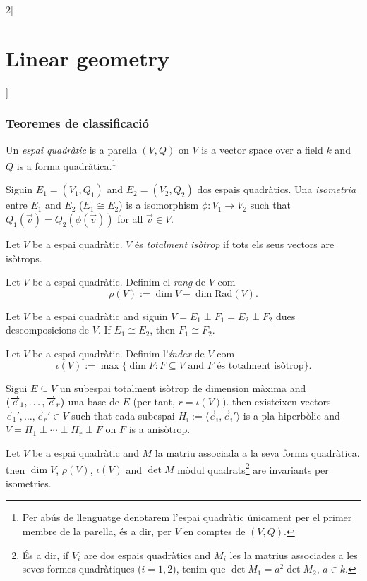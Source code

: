 \documentclass[class=article,10pt,crop=false]{standalone}
\begin{document}
\begin{multicols}{2}[\section{Linear geometry}]
\subsubsection{Teoremes de classificació}
\begin{definition}
Un \textit{espai quadràtic} is a parella $(V,Q)$ on $V$ is a vector space over a field $k$ and $Q$ is a forma quadràtica.\footnote{Per abús de llenguatge denotarem l'espai quadràtic únicament per el primer membre de la parella, és a dir, per $V$ en comptes de $(V,Q)$.}
\end{definition}
\begin{definition}
Siguin $E_1=(V_1,Q_1)$ and $E_2=(V_2,Q_2)$ dos espais quadràtics. Una \textit{isometria} entre $E_1$ and $E_2$ ($E_1\cong E_2$) is a isomorphism $\phi:V_1\rightarrow V_2$ such that $Q_1(\overrightarrow{v})=Q_2(\phi(\overrightarrow{v}))$ for all $\overrightarrow{v}\in V$.
\end{definition}
\begin{definition}
Let $V$ be a espai quadràtic. $V$ és \textit{totalment isòtrop} if tots els seus vectors are isòtrops.
\end{definition}
\begin{definition}
Let $V$ be a espai quadràtic. Definim el \textit{rang} de $V$ com $$\rho(V):=\dim V-\dim\text{Rad}(V).$$
\end{definition}
\begin{theorem}
Let $V$ be a espai quadràtic and siguin $V=E_1\perp F_1=E_2\perp F_2$ dues descomposicions de $V$. If $E_1\cong E_2$, then $F_1\cong F_2$.
\end{theorem}
\begin{definition}
Let $V$ be a espai quadràtic. Definim l'\textit{índex} de $V$ com
$$\iota(V):=\max\{\dim F:F\subseteq V\text{ and $F$ és totalment isòtrop}\}.$$
\end{definition}
\begin{theorem}
Sigui $E\subseteq V$ un subespai totalment isòtrop de dimension màxima and $(\overrightarrow{e}_1,\ldots,\\\overrightarrow{e}_r)$ una base de $E$ (per tant, $r=\iota(V)$). then existeixen vectors $\overrightarrow{e}_1',\ldots,\overrightarrow{e}_r'\in V$ such that cada subespai $H_i:=\langle\overrightarrow{e}_i,\overrightarrow{e}_i'\rangle$ is a pla hiperbòlic and $V=H_1\perp\cdots\perp H_r\perp F$ on $F$ is a anisòtrop.
\end{theorem}
\begin{prop}
Let $V$ be a espai quadràtic and $M$ la matriu associada a la seva forma quadràtica. then $\dim V$, $\rho(V)$, $\iota (V)$ and $\det M$ mòdul quadrats\footnote{És a dir, if $V_i$ are dos espais quadràtics and $M_i$ les la matrius associades a les seves formes quadràtiques ($i=1,2$), tenim que $\det M_1=a^2\det M_2$, $a\in k$.} are invariants per isometries. 
\end{prop}

\end{multicols}
\end{document}
